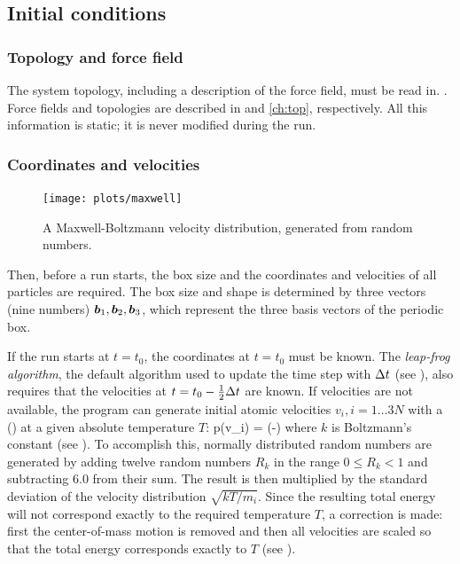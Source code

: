 \subsection{Initial conditions}
\subsubsection{Topology and force field}
The system topology, including a description of the force field, must
be read in.
{.}
{Force fields and topologies are described in 
and \ref{ch:top}, respectively.}
All this information is static; it is never modified during the run.

\subsubsection{Coordinates and velocities}
\begin{figure}
\centerline{\texttt{[image: plots/maxwell]}}
\caption{A Maxwell-Boltzmann velocity distribution, generated from 
    random numbers.}
\label{fig:maxwell}
\end{figure}

Then, before a run starts, the box size and the coordinates and
velocities of  all particles are required. The box size and shape is 
determined by three vectors (nine numbers) $\mbox{\boldmath ${b}$}_1, \mbox{\boldmath ${b}$}_2, \mbox{\boldmath ${b}$}_3$, 
which represent the three basis vectors of the periodic box.

If the run starts at $t=t_0$, the coordinates at $t=t_0$ must be
known. The {\em leap-frog algorithm}, the default algorithm used to 
update the time step with ${\Delta t}$ (see ), also requires 
that the velocities at $t=t_0 - \frac{1}{2} {\Delta t}$ are known. If velocities are not 
available, the program can generate initial atomic velocities 
$v_i, i=1\ldots 3N$ with a  
() at a given absolute temperature $T$:
\beq 
p(v_i) = \exp\left(-\right)
\eeq
where $k$ is Boltzmann's constant (see ).
To accomplish this, normally distributed random numbers are generated
by adding twelve random numbers $R_k$ in the range $0 \le R_k < 1$ and
subtracting 6.0 from their sum. The result is then multiplied by the
standard deviation of the velocity distribution $\sqrt{kT/m_i}$. Since
the resulting total energy will not correspond exactly to the required
temperature $T$, a correction is made: first the center-of-mass motion
is removed and then all velocities are scaled so that the total
energy corresponds exactly to $T$ (see ). 

